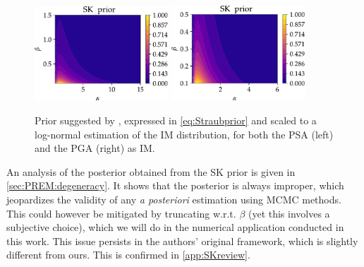\begin{figure}[h]
    \centering
    \includegraphics[width=5cm]{figures/PREM/SK_prior_PSA.pdf}\hspace*{0.5cm}
    \includegraphics[width=5cm]{figures/PREM/SK_prior_PGA.pdf}
    \caption{Prior suggested by \citet{straub_improved_2008},  expressed in \cref{eq:Straubprior} and scaled to a log-normal estimation of the IM distribution, for both the PSA (left) and the PGA (right) as IM.}
    \label{fig:Straubprior}
\end{figure}


An analysis of the posterior obtained from the SK prior is given in \cref{sec:PREM:degeneracy}. It shows that the posterior is always improper, which jeopardizes the validity of any \emph{a posteriori} estimation using MCMC methods. This could however be mitigated by truncating w.r.t. $\beta$ (yet this involves a subjective choice), which we will do in the numerical application conducted in this work. This issue persists in the authors' original framework, which is slightly different from ours. This is confirmed in \cref{app:SKreview}.


